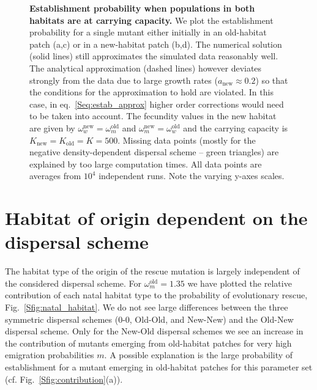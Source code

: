 \documentclass[11pt]{article}
\newcommand{\chg}[1]{\textcolor{change}{#1}}
\begin{document}
\begin{figure}[h!]
	\caption{\textbf{Establishment probability when populations in both habitats are at carrying capacity.} We plot the establishment probability for a single mutant either initially in an old-habitat patch (a,c) or in a new-habitat patch (b,d). The numerical solution (solid lines) still approximates the simulated data reasonably well. The analytical approximation (dashed lines) however deviates strongly from the data due to large growth rates ($a_{\text{new}}\approx 0.2$) so that the conditions for the approximation to hold are violated. In this case, in eq.~\eqref{Seq:estab_approx} higher order corrections would need to be taken into account. \chg{The fecundity values in the new habitat are given by $\omega_w^{\text{new}} = \omega_m^{\text{old}}$ and $\omega_m^{\text{new}} = \omega_w^{\text{old}}$ and the carrying capacity is $K_{\text{new}}=K_{\text{old}}=K=500$.} Missing data points (mostly for the negative density-dependent dispersal scheme -- green triangles) are explained by too large computation times. All data points are averages from $10^4$ independent runs. Note the varying y-axes scales.}
	\label{Sfig:pop_gen}
\end{figure}


\newpage
\renewcommand{\theequation}{F\arabic{equation}}
\setcounter{equation}{0}  %
\section{Habitat of origin dependent on the dispersal scheme}
The habitat type of the origin of the rescue mutation is largely independent of the considered dispersal scheme. For $\omega^\text{old}_m=1.35$ we have plotted the relative contribution of each natal habitat type to the probability of evolutionary rescue, Fig.~\ref{Sfig:natal_habitat}. We do not see large differences between the three symmetric dispersal schemes (0-0, Old-Old, and New-New) and the Old-New dispersal scheme. \chg{Only for the New-Old dispersal schemes we see an increase in the contribution of mutants emerging from old-habitat patches for very high emigration probabilities $m$. A possible explanation is the large probability of establishment for a mutant emerging in old-habitat patches for this parameter set (cf. Fig.~\ref{Sfig:contribution}(a)).}
\end{document}

